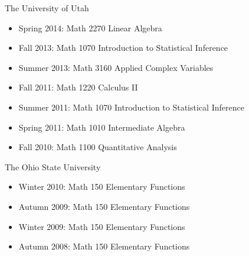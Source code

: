 \documentclass[12pt]{amsart}
\begin{document}
\hspace{-5mm} The University of Utah
\begin{itemize}[leftmargin=9mm]
\item Spring 2014: Math 2270 Linear Algebra
\item Fall 2013: Math 1070 Introduction to Statistical Inference
\item Summer 2013: Math 3160 Applied Complex Variables
\item Fall 2011: Math 1220 Calculus II
\item Summer 2011: Math 1070 Introduction to Statistical Inference
\item Spring 2011: Math 1010 Intermediate Algebra
\item Fall 2010: Math 1100 Quantitative Analysis
\end{itemize}


\hspace{-5mm} The Ohio State University
\begin{itemize}[leftmargin=9mm]
\item Winter 2010: Math 150 Elementary Functions
\item Autumn 2009: Math 150 Elementary Functions
\item Winter 2009: Math 150 Elementary Functions
\item Autumn 2008: Math 150 Elementary Functions
\end{itemize}
 
\end{document}
